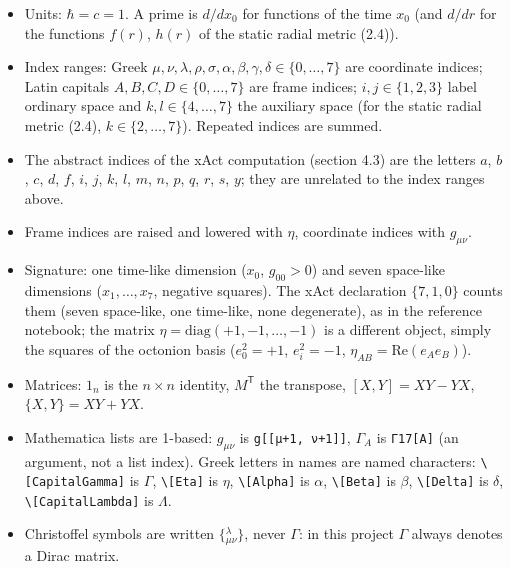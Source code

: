 \documentclass[10pt,a4paper]{article}
\begin{document}
\begin{itemize}
\item Units: $\hbar=c=1$. A prime is $d/dx_0$ for functions of the time $x_0$ (and $d/dr$ for the functions $f(r)$, $h(r)$ of the static radial metric (2.4)).
\item Index ranges: Greek $\mu,\nu,\lambda,\rho,\sigma,\alpha,\beta,\gamma,\delta\in\lbrace0,\dots,7\rbrace$ are coordinate indices; Latin capitals $A,B,C,D\in\lbrace0,\dots,7\rbrace$ are frame indices; $i,j\in\lbrace1,2,3\rbrace$ label ordinary space and $k,l\in\lbrace4,\dots,7\rbrace$ the auxiliary space (for the static radial metric (2.4), $k\in\lbrace2,\dots,7\rbrace$). Repeated indices are summed.
\item The abstract indices of the xAct computation (section 4.3) are the letters $a$, $b$, $c$, $d$, $f$, $i$, $j$, $k$, $l$, $m$, $n$, $p$, $q$, $r$, $s$, $y$; they are unrelated to the index ranges above.
\item Frame indices are raised and lowered with $\eta$, coordinate indices with $g_{\mu\nu}$.
\item Signature: one time-like dimension ($x_0$, $g_{00}>0$) and seven space-like dimensions ($x_1,\dots,x_7$, negative squares). The xAct declaration $\{7,1,0\}$ counts them (seven space-like, one time-like, none degenerate), as in the reference notebook; the matrix $\eta=\mathrm{diag}(+1,-1,\dots,-1)$ is a different object, simply the squares of the octonion basis ($e_0^2=+1$, $e_i^2=-1$, $\eta_{AB}=\mathrm{Re}(e_Ae_B)$).
\item Matrices: $1_n$ is the $n\times n$ identity, $M^{\mathsf T}$ the transpose, $[X,Y]=XY-YX$, $\lbrace X,Y\rbrace=XY+YX$.
\item Mathematica lists are 1-based: $g_{\mu\nu}$ is \texttt{g[[μ+1, ν+1]]}, $\Gamma_A$ is \texttt{Γ17[A]} (an argument, not a list index). Greek letters in names are named characters: \texttt{\textbackslash{}\allowbreak{}[CapitalGamma]} is \texorpdfstring{\ensuremath{\Gamma}}{Γ}, \texttt{\textbackslash{}\allowbreak{}[Eta]} is \texorpdfstring{\ensuremath{\eta}}{η}, \texttt{\textbackslash{}\allowbreak{}[Alpha]} is \texorpdfstring{\ensuremath{\alpha}}{α}, \texttt{\textbackslash{}\allowbreak{}[Beta]} is \texorpdfstring{\ensuremath{\beta}}{β}, \texttt{\textbackslash{}\allowbreak{}[Delta]} is \texorpdfstring{\ensuremath{\delta}}{δ}, \texttt{\textbackslash{}\allowbreak{}[CapitalLambda]} is \texorpdfstring{\ensuremath{\Lambda}}{Λ}.
\item Christoffel symbols are written $\{{}^{\lambda}_{\mu\nu}\}$, never $\Gamma$: in this project $\Gamma$ always denotes a Dirac matrix.
\end{itemize}
\end{document}
